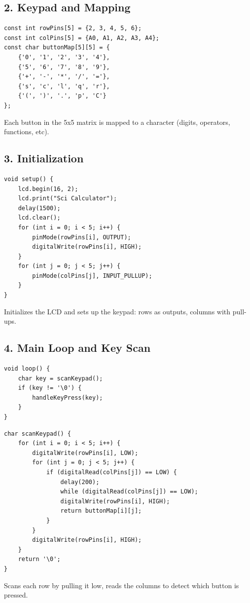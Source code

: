 \documentclass[12pt]{article}
\begin{document}
\subsection*{2. Keypad and Mapping}
\begin{lstlisting}
const int rowPins[5] = {2, 3, 4, 5, 6};
const int colPins[5] = {A0, A1, A2, A3, A4};
const char buttonMap[5][5] = {
    {'0', '1', '2', '3', '4'},
    {'5', '6', '7', '8', '9'},
    {'+', '-', '*', '/', '='},
    {'s', 'c', 'l', 'q', 'r'},
    {'(', ')', '.', 'p', 'C'}
};
\end{lstlisting}
Each button in the 5x5 matrix is mapped to a character (digits, operators, functions, etc).

\subsection*{3. Initialization}
\begin{lstlisting}
void setup() {
    lcd.begin(16, 2);
    lcd.print("Sci Calculator");
    delay(1500);
    lcd.clear();
    for (int i = 0; i < 5; i++) {
        pinMode(rowPins[i], OUTPUT);
        digitalWrite(rowPins[i], HIGH);
    }
    for (int j = 0; j < 5; j++) {
        pinMode(colPins[j], INPUT_PULLUP);
    }
}
\end{lstlisting}
Initializes the LCD and sets up the keypad: rows as outputs, columns with pull-ups.

\subsection*{4. Main Loop and Key Scan}
\begin{lstlisting}
void loop() {
    char key = scanKeypad();
    if (key != '\0') {
        handleKeyPress(key);
    }
}
\end{lstlisting}

\begin{lstlisting}
char scanKeypad() {
    for (int i = 0; i < 5; i++) {
        digitalWrite(rowPins[i], LOW);
        for (int j = 0; j < 5; j++) {
            if (digitalRead(colPins[j]) == LOW) {
                delay(200);
                while (digitalRead(colPins[j]) == LOW);
                digitalWrite(rowPins[i], HIGH);
                return buttonMap[i][j];
            }
        }
        digitalWrite(rowPins[i], HIGH);
    }
    return '\0';
}
\end{lstlisting}
Scans each row by pulling it low, reads the columns to detect which button is pressed.
\end{document}
